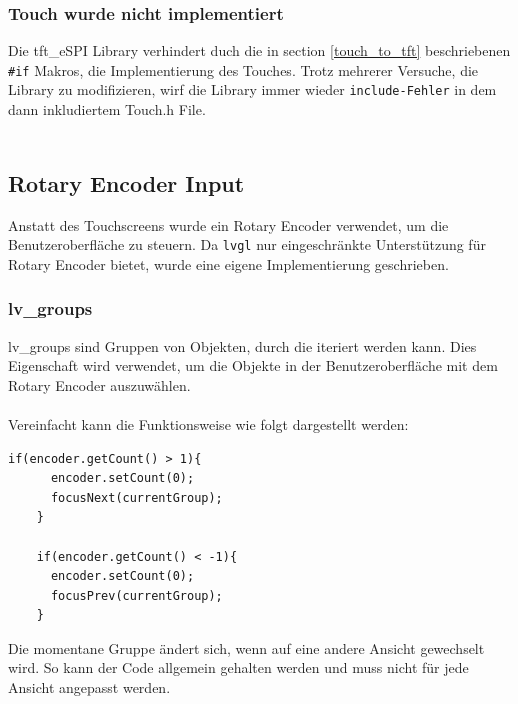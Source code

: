            \subsubsection{Touch wurde nicht implementiert}
            Die tft\_eSPI Library verhindert duch die in section \ref{touch_to_tft} 
            beschriebenen \lstinline{#if} Makros, die Implementierung des Touches.
            Trotz mehrerer Versuche, die Library zu modifizieren, wirf die Library
            immer wieder \lstinline{include-Fehler} in dem dann inkludiertem Touch.h File. \\~\\
            
    \newpage
    \subsection{Rotary Encoder Input}
    Anstatt des Touchscreens wurde ein Rotary Encoder verwendet, um die
    Benutzeroberfläche zu steuern. Da \texttt{lvgl} nur eingeschränkte
    Unterstützung für Rotary Encoder bietet, wurde eine eigene Implementierung
    geschrieben. 

        \subsubsection{lv\_groups}
        lv\_groups sind Gruppen von Objekten, durch die iteriert werden kann.
        Dies Eigenschaft wird verwendet, um die Objekte in der Benutzeroberfläche
        mit dem Rotary Encoder auszuwählen. \\~\\

        Vereinfacht kann die Funktionsweise wie folgt dargestellt werden:
        \begin{lstlisting}[style=cppCode]
    if(encoder.getCount() > 1){
      encoder.setCount(0);
      focusNext(currentGroup);
    }

    if(encoder.getCount() < -1){
      encoder.setCount(0);
      focusPrev(currentGroup);
    }
        \end{lstlisting}

        Die momentane Gruppe ändert sich, wenn auf eine andere Ansicht 
        gewechselt wird. So kann der Code allgemein gehalten werden und
        muss nicht für jede Ansicht angepasst werden. 
            

